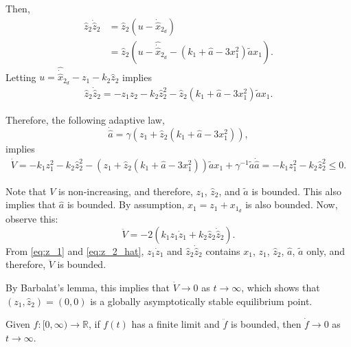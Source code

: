 \documentclass{article}
\begin{document}
Then,
\begin{align}
  \hat{z}_{2} \dot{\hat{z}}_{2} &= \hat{z}_{2} (u - \dot{\hat{x}}_{2_{d}})
  \\
                                &= \hat{z}_{2} (u - \hat{\dot{\hat{x}}}_{2_{d}} - (k_{1} + \hat{a} - 3x_{1}^{2})\tilde{a} x_{1}).
\end{align}
Letting $u = \hat{\dot{\hat{x}}}_{2_{d}} - z_{1} - k_{2}\hat{z}_{2}$ implies
\begin{align}
  \label{eq:z_2_hat}
  \hat{z}_{2} \dot{\hat{z}}_{2} = -z_{1}\hat{z}_{2} -k_{2} \hat{z}_{2}^{2} - \hat{z}_{2} (k_{1} + \hat{a} - 3 x_{1}^{2}) \tilde{a} x_{1}.
\end{align}

Therefore,
the following adaptive law,
\begin{equation}
  \dot{\hat{a}} = \gamma (z_{1} + \hat{z}_{2}(k_{1} + \hat{a} - 3x_{1}^{2})),
\end{equation}
implies
\begin{align}
  \dot{V} = -k_{1}z_{1}^{2} - k_{2} \hat{z}_{2}^{2} - (z_{1} + \hat{z}_{2}(k_{1} + \hat{a} - 3x_{1}^{2}) ) \tilde{a} x_{1} + \gamma^{-1} \tilde{a} \dot{\hat{a}}
  = -k_{1}z_{1}^{2} - k_{2} \hat{z}_{2}^{2} \leq 0.
\end{align}

Note that $V$ is non-increasing,
and therefore, $z_{1}$, $\hat{z}_{2}$, and $\tilde{a}$ is bounded.
This also implies that $\hat{a}$ is bounded.
By assumption, $x_{1} = z_{1} + x_{1_{d}}$ is also bounded.
Now, observe this:
\begin{equation}
  \ddot{V} = -2(k_{1} z_{1}\dot{z}_{1} + k_{2} \hat{z}_{2} \dot{\hat{z}}_{2}).
\end{equation}
From \eqref{eq:z_1} and \eqref{eq:z_2_hat},
$z_{1} \dot{z}_{1}$ and $\hat{z}_{2} \dot{\hat{z}}_{2}$ contains $x_{1}$, $z_{1}$, $\hat{z}_{2}$, $\hat{a}$, $\tilde{a}$ only,
and therefore, $\ddot{V}$ is bounded.

By Barbalat's lemma, this implies that $\dot{V} \to 0$ as $t \to \infty$, which shows that $(z_{1}, \hat{z}_{2}) = (0, 0)$ is a globally asymptotically stable equilibrium point.

\begin{theorem}
  Given $f: [0, \infty) \to \mathbb{R}$,
  if $f(t)$ has a finite limit and $\ddot{f}$ is bounded,
  then $\dot{f} \to 0$ as $t \to \infty$.
\end{theorem}

%
\end{document}
